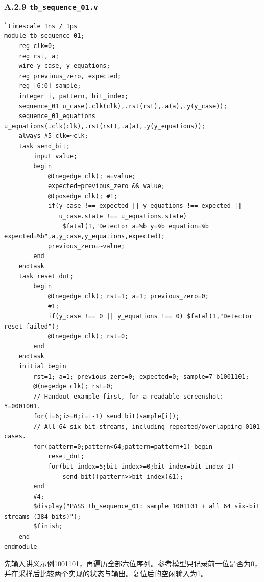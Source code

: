 \documentclass[12pt,a4paper]{ctexart}
\begin{document}
\subsubsection*{A.2.9 \texttt{tb\_sequence\_01.v}}
\begin{lstlisting}
`timescale 1ns / 1ps
module tb_sequence_01;
    reg clk=0;
    reg rst, a;
    wire y_case, y_equations;
    reg previous_zero, expected;
    reg [6:0] sample;
    integer i, pattern, bit_index;
    sequence_01 u_case(.clk(clk),.rst(rst),.a(a),.y(y_case));
    sequence_01_equations u_equations(.clk(clk),.rst(rst),.a(a),.y(y_equations));
    always #5 clk=~clk;
    task send_bit;
        input value;
        begin
            @(negedge clk); a=value;
            expected=previous_zero && value;
            @(posedge clk); #1;
            if(y_case !== expected || y_equations !== expected ||
               u_case.state !== u_equations.state)
                $fatal(1,"Detector a=%b y=%b equation=%b expected=%b",a,y_case,y_equations,expected);
            previous_zero=~value;
        end
    endtask
    task reset_dut;
        begin
            @(negedge clk); rst=1; a=1; previous_zero=0;
            #1;
            if(y_case !== 0 || y_equations !== 0) $fatal(1,"Detector reset failed");
            @(negedge clk); rst=0;
        end
    endtask
    initial begin
        rst=1; a=1; previous_zero=0; expected=0; sample=7'b1001101;
        @(negedge clk); rst=0;
        // Handout example first, for a readable screenshot: Y=0001001.
        for(i=6;i>=0;i=i-1) send_bit(sample[i]);
        // All 64 six-bit streams, including repeated/overlapping 0101 cases.
        for(pattern=0;pattern<64;pattern=pattern+1) begin
            reset_dut;
            for(bit_index=5;bit_index>=0;bit_index=bit_index-1)
                send_bit((pattern>>bit_index)&1);
        end
        #4;
        $display("PASS tb_sequence_01: sample 1001101 + all 64 six-bit streams (384 bits)");
        $finish;
    end
endmodule
\end{lstlisting}
先输入讲义示例1001101，再遍历全部六位序列。参考模型只记录前一位是否为0，并在采样后比较两个实现的状态与输出。复位后的空闲输入为1。
\end{document}
